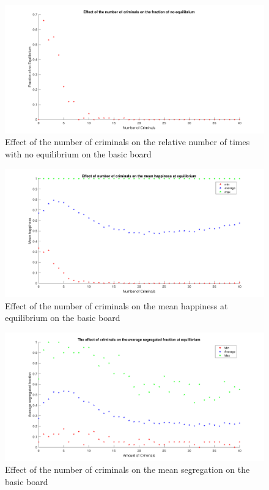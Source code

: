 \begin{figure}[H]
	\centering
    \includegraphics[width=\textwidth]{aantcrim-fracnoeq.pdf}
    \caption{Effect of the number of criminals on the relative number of times with no equilibrium on the basic board}
    \label{fig:cr-noeq}
\end{figure}

\begin{figure}[H]
	\centering
    \includegraphics[width=\textwidth]{aantcrim-gemeindhappiness.pdf}
    \caption{Effect of the number of criminals on the mean happiness at equilibrium on the basic board}
    \label{fig:cr-happ}
\end{figure}

\begin{figure}[H]
	\centering
    \includegraphics[width=\textwidth]{aantcrim-segreind.pdf}
    \caption{Effect of the number of criminals on the mean segregation on the basic board}
    \label{fig:cr-segr}
\end{figure}

